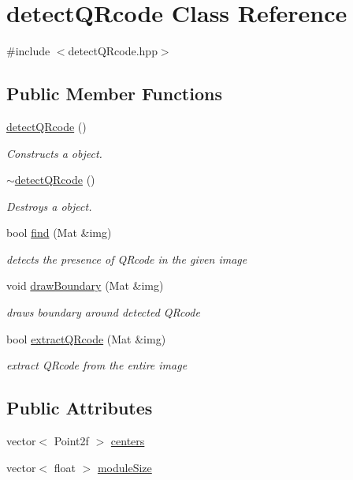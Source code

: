 \hypertarget{classdetectQRcode}{}\section{detect\+Q\+Rcode Class Reference}
\label{classdetectQRcode}


{\ttfamily \#include $<$detect\+Q\+Rcode.\+hpp$>$}

\subsection*{Public Member Functions}
\begin{DoxyCompactItemize}
\item 
\hyperlink{classdetectQRcode_a5ff24c2afb32b62855512e9d6e7342e1}{detect\+Q\+Rcode} ()
\begin{DoxyCompactList}\small\item\em Constructs a object. \end{DoxyCompactList}\item 
\hyperlink{classdetectQRcode_a9e5df0cf2a68be681452cb87ee780334}{$\sim$detect\+Q\+Rcode} ()
\begin{DoxyCompactList}\small\item\em Destroys a object. \end{DoxyCompactList}\item 
bool \hyperlink{classdetectQRcode_afbac1fead0246a27d3e143bb0f1223f0}{find} (Mat \&img)
\begin{DoxyCompactList}\small\item\em detects the presence of Q\+Rcode in the given image \end{DoxyCompactList}\item 
void \hyperlink{classdetectQRcode_af429ccf110e1250e38e2a9fa249ce459}{draw\+Boundary} (Mat \&img)
\begin{DoxyCompactList}\small\item\em draws boundary around detected Q\+Rcode \end{DoxyCompactList}\item 
bool \hyperlink{classdetectQRcode_a07eb3b6401b656d0d25f3ddbaec791bc}{extract\+Q\+Rcode} (Mat \&img)
\begin{DoxyCompactList}\small\item\em extract Q\+Rcode from the entire image \end{DoxyCompactList}\end{DoxyCompactItemize}
\subsection*{Public Attributes}
\begin{DoxyCompactItemize}
\item 
vector$<$ Point2f $>$ \hyperlink{classdetectQRcode_afe6facdb30c910a01e4f607d108a5db5}{centers}
\item 
vector$<$ float $>$ \hyperlink{classdetectQRcode_a5f57e433cf4135aa0bf236dee35ff044}{module\+Size}
\end{DoxyCompactItemize}


